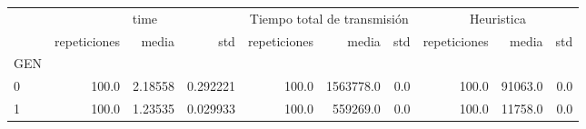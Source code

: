 \begin{tabular}{lrrrrrrrrr}
\toprule
{} & \multicolumn{3}{c}{time} & \multicolumn{3}{c}{Tiempo total de transmisión} & \multicolumn{3}{c}{Heuristica} \\
{} & repeticiones &    media &       std &                repeticiones &      media &  std & repeticiones &    media &  std \\
GEN &              &          &           &                             &            &      &              &          &      \\
\midrule
0   &        100.0 &  2.18558 &  0.292221 &                       100.0 &  1563778.0 &  0.0 &        100.0 &  91063.0 &  0.0 \\
1   &        100.0 &  1.23535 &  0.029933 &                       100.0 &   559269.0 &  0.0 &        100.0 &  11758.0 &  0.0 \\
\bottomrule
\end{tabular}
